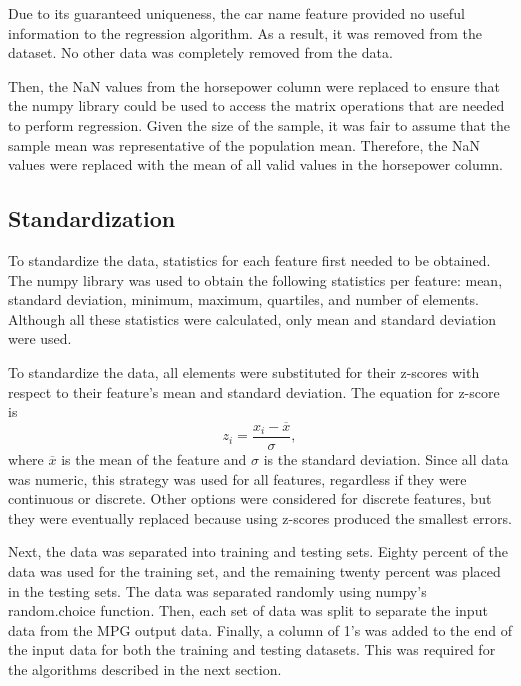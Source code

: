\documentclass[12pt]{article}
\begin{document}
    Due to its guaranteed uniqueness, the car name feature provided no useful information to the regression algorithm. As a result, it was removed from the dataset. No other data was completely removed from the data.
    
    Then, the NaN values from the horsepower column were replaced to ensure that the numpy library could be used to access the matrix operations that are needed to perform regression. Given the size of the sample, it was fair to assume that the sample mean was representative of the population mean. Therefore, the NaN values were replaced with the mean of all valid values in the horsepower column.
    \subsection{Standardization} \label{standardization}
    
    To standardize the data, statistics for each feature first needed to be obtained. The numpy library was used to obtain the following statistics per feature: mean, standard deviation, minimum, maximum, quartiles, and number of elements. Although all these statistics were calculated, only mean and standard deviation were used.
    
    To standardize the data, all elements were substituted for their z-scores with respect to their feature's mean and standard deviation. The equation for z-score is
    \begin{equation} \label{eq: 1}
        z_i = \frac{x_i - \overline{x}}{\sigma},
    \end{equation}
    where $\overline{x}$ is the mean of the feature and $\sigma$ is the standard deviation. Since all data was numeric, this strategy was used for all features, regardless if they were continuous or discrete. Other options were considered for discrete features, but they were eventually replaced because using z-scores produced the smallest errors.
    
    Next, the data was separated into training and testing sets. Eighty percent of the data was used for the training set, and the remaining twenty percent was placed in the testing sets. The data was separated randomly using numpy's random.choice function. Then, each set of data was split to separate the input data from the MPG output data. Finally, a column of 1's was added to the end of the input data for both the training and testing datasets. This was required for the algorithms described in the next section.
    
\end{document}
